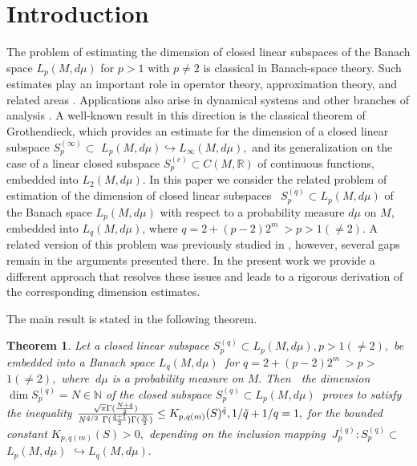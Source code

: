 \documentclass[pdflatex,sn-mathphys-num]{sn-jnl}%
\theoremstyle{thmstyleone}%
\newtheorem{theorem}{Theorem}%
\theoremstyle{thmstyletwo}%
\theoremstyle{thmstylethree}%
\begin{document}
\section{Introduction}

The problem of estimating the dimension of closed linear subspaces of the 
Banach space $L_{p}(M,d\mu )$ for $p>1$ with $p\neq 2$ is
classical in Banach-space theory. Such estimates play an important role in
operator theory, approximation theory, and related areas 
\cite{PrBl,BuBe,KaPe,KrPeSe,LySh,MiGr,Nowa,Plic}. Applications also arise in
dynamical systems and other branches of analysis 
\cite{FoSeTe,Kato,Lady-1,Lady-2,Nino,Tao,Tema}. A well-known result in this
direction is the classical theorem of Grothendieck, which provides an
estimate for the dimension of a closed linear subspace 
$S_{p}^{(\infty	)}\subset $ $L_{p}(M,d\mu )\hookrightarrow L_{\infty }(M,d\mu ),$ and its
generalization on the case of a linear closed subspace $S_{p}^{(c)}\subset
C(M,\mathbb{R})$ of continuous functions, embedded into $%
L_{2}(M,d\mu )$. In this paper we consider the related problem of estimation
of the dimension of closed linear subspaces {\ }$S_{p}^{(q)}\subset
L_{p}(M,d\mu )$ of the Banach space $L_{p}(M,d\mu )$ with
respect to a probability measure $d\mu $ on $M$, embedded into $%
L_{q}(M,d\mu )$, where $q=2+(p-2)2^{m}\ >p>1(\neq 2)$. A related version of
this problem was previously studied in \cite{BaPr-2}, however, several gaps
remain in the arguments presented there. In the present work we provide a
different approach that resolves these issues and leads to a rigorous
derivation of the corresponding dimension estimates.

The main result is stated in the following theorem.

\begin{theorem}
	\label{Tm_1} Let a closed linear subspace $S_{p}^{(q)}\subset L_{p}(M,d\mu
	),p>1(\neq 2),$ be embedded into a Banach space $L_{q}(M,d\mu )\ 
	$ for $q=2+(p-2)2^{m}\ >p>$ $1(\neq 2),$ where $\ d\mu $ is a probability
	measure on $M.$ Then $\ $ the dimension $\dim S_{p}^{(q)}=N\in \mathbb{N}$
	of the closed subspace $S_{p}^{(q)}\subset L_{p}(M,d\mu )\ $ proves to
	satisfy the inequality $\frac{\sqrt{\pi }\Gamma (\frac{N+\tilde{q}}{2})}{N^{%
			\tilde{q}/2}\ \Gamma (\frac{\tilde{q}+1}{2})\Gamma (\frac{N}{2})}\leq
	K_{p,q(m)}(S)^{\tilde{q}},1/\tilde{q}+1/q=1,$ for the bounded constant $%
	K_{p,q(m)}(S)>0,$ depending on the inclusion mapping $\
	J_{p}^{(q)}:S_{p}^{(q)}\subset $ $L_{p}(M,d\mu )$ $\hookrightarrow
	L_{q}(M,d\mu ).$
\end{theorem}
\end{document}
